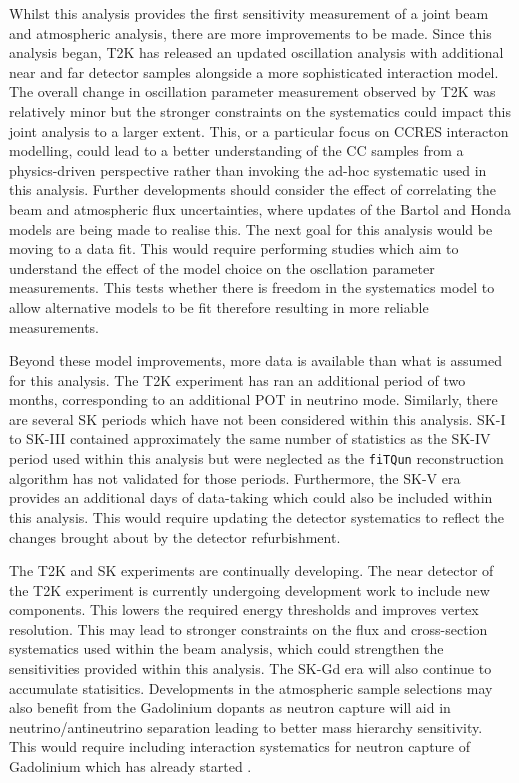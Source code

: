 Whilst this analysis provides the first sensitivity measurement of a joint beam and atmospheric analysis, there are more improvements to be made. Since this analysis began, T2K has released an updated oscillation analysis with additional near and far detector samples alongside a more sophisticated interaction model. The overall change in oscillation parameter measurement observed by T2K was relatively minor  but the stronger constraints on the systematics could impact this joint analysis to a larger extent. This, or a particular focus on CCRES interacton modelling, could lead to a better understanding of the CC\quickmath{1\pi} samples from a physics-driven perspective rather than invoking the ad-hoc systematic used in this analysis. Further developments should consider the effect of correlating the beam and atmospheric flux uncertainties, where updates of the Bartol and Honda models are being made to realise this. The next goal for this analysis would be moving to a data fit. This would require performing studies which aim to understand the effect of the model choice on the oscllation parameter measurements. This tests whether there is freedom in the systematics model to allow alternative models to be fit therefore resulting in more reliable measurements. 

Beyond these model improvements, more data is available than what is assumed for this analysis. The T2K experiment has ran an additional period of two months, corresponding to an additional POT in neutrino mode. Similarly, there are several SK periods which have not been considered within this analysis. SK-I to SK-III contained approximately the same number of statistics as the SK-IV period used within this analysis but were neglected as the \texttt{fiTQun} reconstruction algorithm has not validated for those periods. Furthermore, the SK-V era provides an additional  days of data-taking which could also be included within this analysis. This would require updating the detector systematics to reflect the changes brought about by the detector refurbishment.

The T2K and SK experiments are continually developing. The near detector of the T2K experiment is currently undergoing development work to include new components. This lowers the required energy thresholds and improves vertex resolution. This may lead to stronger constraints on the flux and cross-section systematics used within the beam analysis, which could strengthen the sensitivities provided within this analysis. The SK-Gd era will also continue to accumulate statisitics. Developments in the atmospheric sample selections may also benefit from the Gadolinium dopants as neutron capture will aid in neutrino/antineutrino separation leading to better mass hierarchy sensitivity. This would require including interaction systematics for neutron capture of Gadolinium which has already started .

